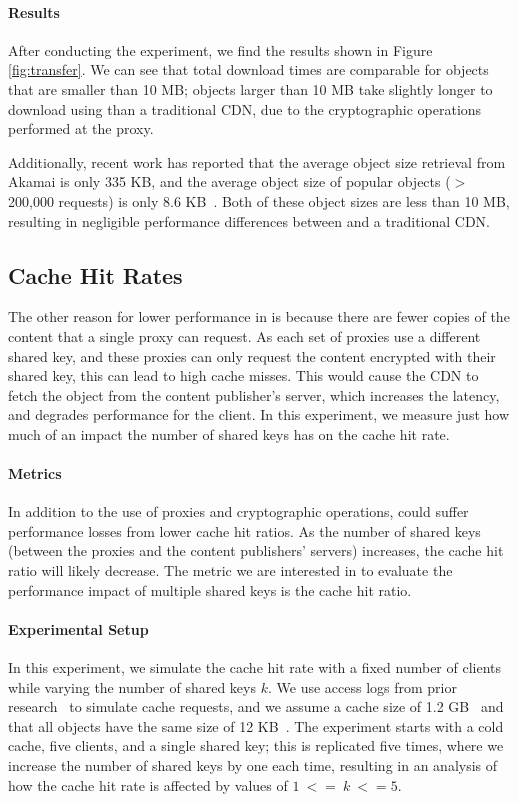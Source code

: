 \paragraph{Results}
After conducting the experiment, we find the results shown in Figure \ref{fig:transfer}.  We can see that total download times are comparable 
for objects that are smaller than 10 MB; objects larger than 10 MB take slightly longer to download using \system{} than a traditional CDN, 
due to the cryptographic operations performed at the proxy.  

Additionally, recent work has reported that the average object size retrieval from Akamai is only 335 KB, and the average object size 
of popular objects ($>$ 200,000 requests) is only 8.6 KB~\cite{berger2016achieving}.  Both of these object sizes are less than 10 MB, resulting in negligible 
performance differences between \system{} and a traditional CDN.

\subsection{Cache Hit Rates}
The other reason for lower performance in \system{} is because there are fewer copies of the content that a single proxy can request.  As each set 
of proxies use a different shared key, and these proxies can only request the content encrypted with their shared key, this can lead to high cache misses.  
This would cause the CDN to fetch the object from the content publisher's server, which increases the latency, and degrades performance for the client.  
In this experiment, we measure just how much of an impact the number of shared keys has on the cache hit rate.\\

\paragraph{Metrics}
In addition to the use of proxies and cryptographic operations, \system{} could suffer performance losses from lower cache hit ratios.  As the number 
of shared keys (between the proxies and the content publishers' servers) increases, the cache hit ratio will likely decrease.  The metric we are interested 
in to evaluate the performance impact of multiple shared keys is the cache hit ratio.\\

\paragraph{Experimental Setup}
In this experiment, we simulate the cache hit rate with a fixed number of clients while varying the number of shared keys $k$.  We use 
access logs from prior research~\cite{andersen2005improving} to simulate cache requests, and we assume a cache size of 1.2 GB~\cite{berger2017adaptsize} and that all objects have 
the same size of 12 KB~\cite{berger2016achieving}.  The experiment starts with a cold cache, five clients, and a single shared key; this is 
replicated five times, where we increase the number of shared keys by one each time, resulting in an analysis of how the cache hit rate is affected 
by values of $1~<=~k~<= 5$.

